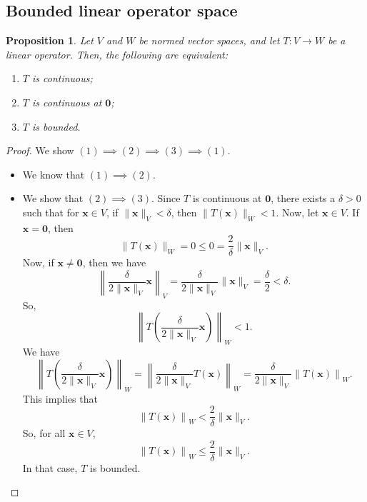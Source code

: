 \documentclass[a4paper, openany]{memoir}
\theoremstyle{definition}
\theoremstyle{plain}
\newtheorem{proposition}[definition]{Proposition}
\begin{document}
    \subsection{Bounded linear operator space}
    \begin{proposition}
        Let $V$ and $W$ be normed vector spaces, and let $T: V \to W$ be a linear operator. Then, the following are equivalent:
        \begin{enumerate}
            \item $T$ is continuous;
            \item $T$ is continuous at $\bm{0}$;
            \item $T$ is bounded.
        \end{enumerate}
    \end{proposition}
    \begin{proof}
        We show $(1) \implies (2) \implies (3) \implies (1)$.
        \begin{itemize}
            \item We know that $(1) \implies (2)$.
            
            \item We show that $(2) \implies (3)$. Since $T$ is continuous at $\bm{0}$, there exists a $\delta > 0$ such that for $\bm{x} \in V$, if $\lVert \bm{x} \rVert_V < \delta$, then $\lVert T(\bm{x}) \rVert_W < 1$. Now, let $\bm{x} \in V$. If $\bm{x} = \bm{0}$, then 
            \[\lVert T(\bm{x}) \rVert_W = 0 \leq 0 = \frac{2}{\delta} \lVert \bm{x} \rVert_V.\]
            Now, if $\bm{x} \neq \bm{0}$, then we have
            \[\left\lVert\frac{\delta}{2 \lVert \bm{x} \rVert_V} \bm{x} \right\rVert_V = \frac{\delta}{2\lVert \bm{x} \rVert_V} \lVert \bm{x} \rVert_V = \frac{\delta}{2} < \delta.\]
            So,
            \[\left\lVert T\left(\frac{\delta}{2 \lVert \bm{x} \rVert_V} \bm{x}\right) \right\rVert_W < 1.\]
            We have
            \[\left\lVert T\left(\frac{\delta}{2 \lVert \bm{x} \rVert_V} \bm{x}\right) \right\rVert_W = \left\lVert \frac{\delta}{2 \lVert \bm{x} \rVert_V} T(\bm{x}) \right\rVert_W = \frac{\delta}{2 \lVert \bm{x} \rVert_V} \left\lVert T(\bm{x}) \right\rVert_W.\]
            This implies that
            \[\left\lVert T(\bm{x}) \right\rVert_W < \frac{2}{\delta} \lVert \bm{x} \rVert_V.\]
            So, for all $\bm{x} \in V$,
            \[\left\lVert T(\bm{x}) \right\rVert_W \leq \frac{2}{\delta} \lVert \bm{x} \rVert_V.\]
            In that case, $T$ is bounded.
            

\end{itemize}
\end{proof}
\end{document}
